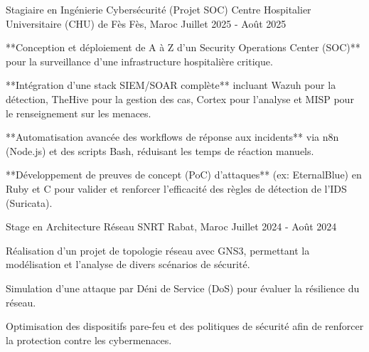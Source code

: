 \begin{cventries}

  \cventry
  {Stagiaire en Ingénierie Cybersécurité (Projet SOC)} %
  {Centre Hospitalier Universitaire (CHU) de Fès} %
  {Fès, Maroc} %
  {Juillet 2025 - Août 2025} %
  {
    \begin{cvitems}
      \item {**Conception et déploiement de A à Z d'un Security Operations Center (SOC)** pour la surveillance d'une infrastructure hospitalière critique.}
      \item {**Intégration d'une stack SIEM/SOAR complète** incluant Wazuh pour la détection, TheHive pour la gestion des cas, Cortex pour l'analyse et MISP pour le renseignement sur les menaces.}
      \item {**Automatisation avancée des workflows de réponse aux incidents** via n8n (Node.js) et des scripts Bash, réduisant les temps de réaction manuels.}
      \item {**Développement de preuves de concept (PoC) d'attaques** (ex: EternalBlue) en Ruby et C pour valider et renforcer l'efficacité des règles de détection de l'IDS (Suricata).}
    \end{cvitems}
  }
  \cventry
  {Stage en Architecture Réseau} %
  {SNRT} %
  {Rabat, Maroc} %
  {Juillet 2024 - Août 2024} %
  {
    \begin{cvitems} %
      \item {Réalisation d'un projet de topologie réseau avec GNS3, permettant la modélisation et l'analyse de divers scénarios de sécurité.}
      \item {Simulation d’une attaque par Déni de Service (DoS) pour évaluer la résilience du réseau.}
      \item {Optimisation des dispositifs pare-feu et des politiques de sécurité afin de renforcer la protection contre les cybermenaces.}
    \end{cvitems}
  }
\end{cventries}

